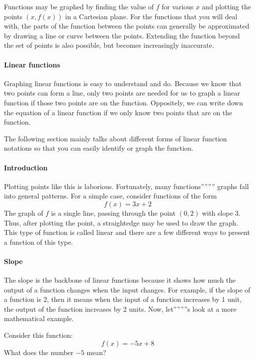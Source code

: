 Functions may be graphed by finding the value of $f$ for various $x$ and plotting the points $(x, f(x))$ in a Cartesian plane. For the functions that you will deal with, the parts of the function between the points can generally be approximated by drawing a line or curve between the points. Extending the function beyond the set of points is also possible, but becomes increasingly inaccurate.

\paragraph{Linear functions}

Graphing linear functions is easy to understand and do. Because we know that two points can form a line, only two points are needed for us to graph a linear function if those two points are on the function. Oppositely, we can write down the equation of a linear function if we only know two points that are on the function.

The following section mainly talks about different forms of linear function notations so that you can easily identify or graph the function.

\paragraph{Introduction}

Plotting points like this is laborious. Fortunately, many functions'''''''' graphs fall into general patterns. For a simple case, consider functions of the form
$$
f(x) = 3x + 2
$$
The graph of $f$ is a single line, passing through the point $(0, 2)$ with slope 3. Thus, after plotting the point, a straightedge may be used to draw the graph. This type of function is called linear and there are a few different ways to present a function of this type.

\paragraph{Slope}

The slope is the backbone of linear functions because it shows how much the output of a function changes when the input changes. For example, if the slope of a function is 2, then it means when the input of a function increases by 1 unit, the output of the function increases by 2 units. Now, let''''''''s look at a more mathematical example.

Consider this function: 
$$
f(x) = -5x + 8
$$
What does the number $-5$ mean?

